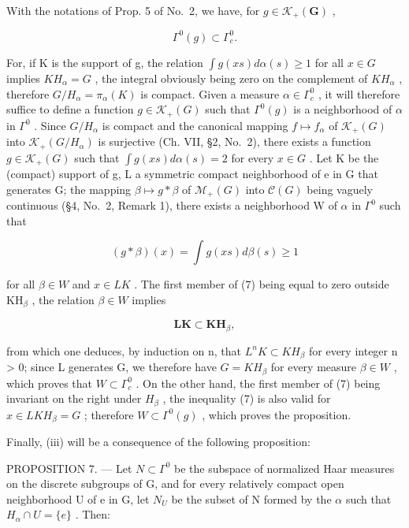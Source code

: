 With the notations of Prop. 5 of No.~2, we have, for \(g \in \mathcal{K}_{+}(\mathbf{G})\) ,

\[
\Gamma^ {0} (g) \subset \Gamma_ {c} ^ {0}.\tag{6}
\]

For, if K is the support of g, the relation \(\int g(xs) d\alpha(s) \geqslant 1\) for all \(x \in G\) implies \(KH_{\alpha} = G\) , the integral obviously being zero on the complement of \(KH_{\alpha}\) , therefore \(G/H_{\alpha} = \pi_{\alpha}(K)\) is compact. Given a measure \(\alpha \in \Gamma_{c}^{0}\) , it will therefore suffice to define a function \(g \in \mathcal{K}_{+}(G)\) such that \(\Gamma^{0}(g)\) is a neighborhood of \(\alpha\) in \(\Gamma^{0}\) . Since \(G/H_{\alpha}\) is compact and the canonical mapping \(f \mapsto f_{\alpha}\) of \(\mathcal{K}_{+}(G)\) into \(\mathcal{K}_{+}(G/H_{\alpha})\) is surjective (Ch. VII, §2, No.~2), there exists a function \(g \in \mathcal{K}_{+}(G)\) such that \(\int g(xs) d\alpha(s) = 2\) for every \(x \in G\) . Let K be the (compact) support of g, L a symmetric compact neighborhood of e in G that generates G; the mapping \(\beta \mapsto g*\beta\) of \(\mathcal{M}_{+}(G)\) into \(\mathcal{C}(G)\) being vaguely continuous (§4, No.~2, Remark 1), there exists a neighborhood W of \(\alpha\) in \(\Gamma^{0}\) such that

\[
(g * \beta) (x) = \int g (x s) d \beta (s) \geqslant 1\tag{7}
\]

for all \(\beta \in W\) and \(x \in LK\) . The first member of (7) being equal to zero outside \(\mathrm{KH}_{\beta}\) , the relation \(\beta \in W\) implies

\[
\mathbf {L K} \subset \mathbf {K H} _ {\beta},
\]

from which one deduces, by induction on n, that \(L^{n}K \subset KH_{\beta}\) for every integer n \textgreater{} 0; since L generates G, we therefore have \(G = KH_{\beta}\) for every measure \(\beta \in W\) , which proves that \(W \subset \Gamma_{c}^{0}\) . On the other hand, the first member of (7) being invariant on the right under \(H_{\beta}\) , the inequality (7) is also valid for \(x \in LKH_{\beta} = G\) ; therefore \(W \subset \Gamma^{0}(g)\) , which proves the proposition.

Finally, (iii) will be a consequence of the following proposition:

PROPOSITION 7. --- Let \(N \subset \Gamma^{0}\) be the subspace of normalized Haar measures on the discrete subgroups of G, and for every relatively compact open neighborhood U of e in G, let \(N_{U}\) be the subset of N formed by the \(\alpha\) such that \(H_{\alpha} \cap U = \{e\}\) . Then:

